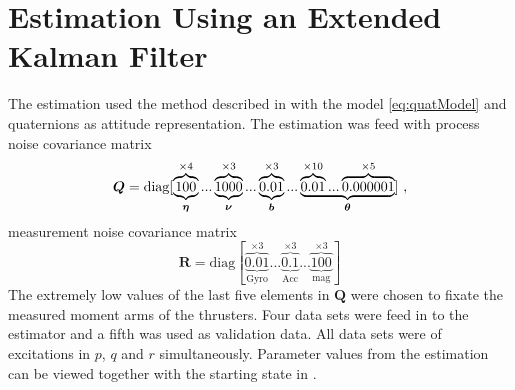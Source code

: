 \section{Estimation Using an Extended Kalman Filter}
The \abbrEKF estimation used the method described in  with the model \eqref{eq:quatModel} and quaternions as attitude representation. The estimation was feed with process noise covariance matrix
\begin{equation*}
\boldsymbol{Q}=\text{diag}[\underbrace{\overbrace{100}^{\times4}}_{\boldsymbol{\eta}}... \underbrace{\overbrace{1000}^{\times3}}_{\boldsymbol{\nu}}...\underbrace{\overbrace{0.01}^{\times3}}_{\boldsymbol{b}}... \underbrace{\overbrace{0.01}^{\times10}... \overbrace{0.000001}^{\times5}}_{\boldsymbol{\theta}}]\text{ ,}
\end{equation*}
measurement noise covariance matrix
\begin{equation*}
\boldsymbol{R} = \text{diag}[\underbrace{\overbrace{0.01}^{\times3}}_{\text{Gyro}}... \underbrace{\overbrace{0.1}^{\times3}}_{\text{Acc}}... \underbrace{\overbrace{100}^{\times3}}_{\text{mag}}]
\end{equation*}
The extremely low values of the last five elements in $\boldsymbol{Q}$ were chosen to fixate the measured moment arms of the thrusters. Four data sets were feed in to the estimator and a fifth was used as validation data. All data sets were of excitations in $p$, $q$ and $r$ simultaneously. Parameter values from the estimation can be viewed together with the starting state in . 
